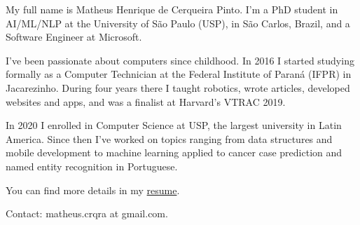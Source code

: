 My full name is Matheus Henrique de Cerqueira Pinto. I'm a PhD student in AI/ML/NLP at the University of S\~ao Paulo (USP), in S\~ao Carlos, Brazil, and a Software Engineer at Microsoft.

I've been passionate about computers since childhood. In 2016 I started studying formally as a Computer Technician at the Federal Institute of Paran\'a (IFPR) in Jacarezinho. During four years there I taught robotics, wrote articles, developed websites and apps, and was a finalist at Harvard's VTRAC 2019.

In 2020 I enrolled in Computer Science at USP, the largest university in Latin America. Since then I've worked on topics ranging from data structures and mobile development to machine learning applied to cancer case prediction and named entity recognition in Portuguese.

You can find more details in my \href{https://drive.google.com/file/d/1P8LEyNxtdcKM7c20k-iESvO_vWq0Ie89/view?usp=sharing}{resume}.

Contact: matheus.crqra at gmail.com.
